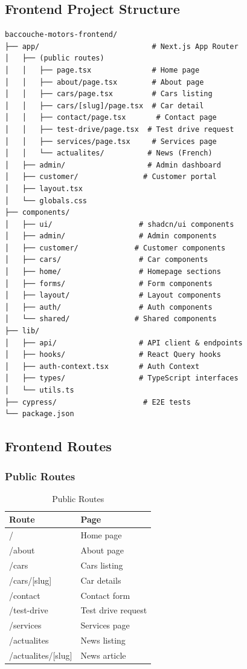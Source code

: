\documentclass[12pt,a4paper]{article}
\begin{document}
\subsection{Frontend Project Structure}

\begin{verbatim}
baccouche-motors-frontend/
├── app/                          # Next.js App Router
│   ├── (public routes)
│   │   ├── page.tsx              # Home page
│   │   ├── about/page.tsx        # About page
│   │   ├── cars/page.tsx         # Cars listing
│   │   ├── cars/[slug]/page.tsx  # Car detail
│   │   ├── contact/page.tsx       # Contact page
│   │   ├── test-drive/page.tsx  # Test drive request
│   │   ├── services/page.tsx     # Services page
│   │   └── actualites/          # News (French)
│   ├── admin/                   # Admin dashboard
│   ├── customer/               # Customer portal
│   ├── layout.tsx
│   └── globals.css
├── components/
│   ├── ui/                    # shadcn/ui components
│   ├── admin/                 # Admin components
│   ├── customer/             # Customer components
│   ├── cars/                  # Car components
│   ├── home/                  # Homepage sections
│   ├── forms/                 # Form components
│   ├── layout/                # Layout components
│   ├── auth/                  # Auth components
│   └── shared/               # Shared components
├── lib/
│   ├── api/                   # API client & endpoints
│   ├── hooks/                 # React Query hooks
│   ├── auth-context.tsx       # Auth Context
│   ├── types/                 # TypeScript interfaces
│   └── utils.ts
├── cypress/                    # E2E tests
└── package.json
\end{verbatim}

\subsection{Frontend Routes}

\subsubsection{Public Routes}

\begin{table}[h]
\centering
\caption{Public Routes}
\begin{tabular}{@{}ll@{}}
\toprule
Route & Page \\
\midrule
/ & Home page \\
/about & About page \\
/cars & Cars listing \\
/cars/[slug] & Car details \\
/contact & Contact form \\
/test-drive & Test drive request \\
/services & Services page \\
/actualites & News listing \\
/actualites/[slug] & News article \\
\bottomrule
\end{tabular}
\end{table}
\end{document}
